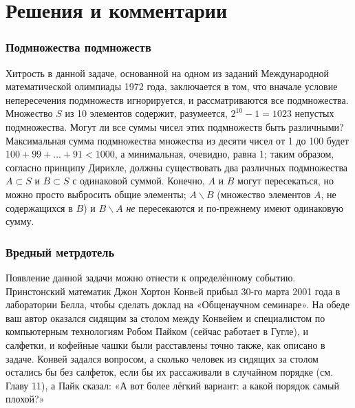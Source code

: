 \section*{Решения и комментарии}

\subsubsection*{Подмножества подмножеств}%

Хитрость в данной задаче, основанной на одном из заданий Международной математической олимпиады 1972 года, заключается в том, что вначале условие непересечения подмножеств игнорируется, и рассматриваются все подмножества.
Множество $S$ из 10 элементов содержит, разумеется, $2^{10} - 1 = 1023$ непустых подмножества.
Могут ли все суммы чисел этих подмножеств быть различными?
Максимальная сумма подмножества множества из десяти чисел от 1 до 100 будет 
$100+99+...+91<1000$, а минимальная, очевидно, равна 1; таким образом, согласно принципу Дирихле, должны существовать два различных подмножества $A\subset S$ и $B\subset S$ 
с одинаковой суммой.
Конечно, $A$ и $B$ могут пересекаться, но можно просто выбросить общие элементы;
$A\backslash B$ (множество элементов $A$, не содержащихся в $B$) и $B\backslash A$ \emph{не} пересекаются и по-прежнему имеют одинаковую сумму.\heart

\subsubsection*{Вредный метрдотель}%

Появление данной задачи можно отнести к определённому событию.
Принстонский математик Джон Хортон Конвeй %
прибыл 30-го марта 2001 года в лаборатории Белла, %
чтобы сделать доклад на «Общенаучном семинаре». %
На обеде ваш автор оказался сидящим за столом между Конвейем и специалистом по компьютерным технологиям Робом Пайком %
(сейчас работает в Гугле), и салфетки, и кофейные чашки были расставлены точно также, как описано в задаче.
Конвей задался вопросом, а сколько человек из
сидящих за столом остались бы без салфеток, если бы их рассаживали в случайном порядке (см. Главу 11), а Пайк сказал: «А вот более лёгкий вариант: а какой порядок самый плохой?»

\bigskip

